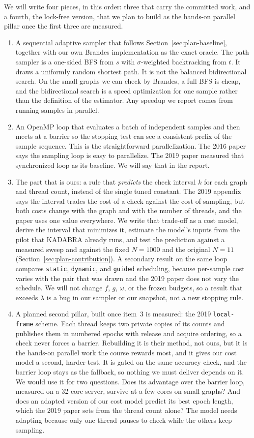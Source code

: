 \documentclass[11pt]{article}
\begin{document}
We will write four pieces, in this order: three that carry the committed work, and a fourth, the lock-free version, that we plan to build as the hands-on parallel pillar once the first three are measured.

\begin{enumerate}
\item A sequential adaptive sampler that follows Section~\ref{sec:plan-baseline}, together with our own Brandes implementation as the exact oracle. The path sampler is a one-sided BFS from $s$ with $\sigma$-weighted backtracking from $t$. It draws a uniformly random shortest path. It is not the balanced bidirectional search. On the small graphs we can check by Brandes, a full BFS is cheap, and the bidirectional search is a speed optimization for one sample rather than the definition of the estimator. Any speedup we report comes from running samples in parallel.
\item An OpenMP loop that evaluates a batch of independent samples and then meets at a barrier so the stopping test can see a consistent prefix of the sample sequence. This is the straightforward parallelization. The 2016 paper says the sampling loop is easy to parallelize. The 2019 paper measured that synchronized loop as its baseline. We will say that in the report.
\item The part that is ours: a rule that \emph{predicts} the check interval $k$ for each graph and thread count, instead of the single tuned constant. The 2019 appendix says the interval trades the cost of a check against the cost of sampling, but both costs change with the graph and with the number of threads, and the paper uses one value everywhere. We write that trade-off as a cost model, derive the interval that minimizes it, estimate the model's inputs from the pilot that KADABRA already runs, and test the prediction against a measured sweep and against the fixed $N=1000$ and the original $N=11$ (Section~\ref{sec:plan-contribution}). A secondary result on the same loop compares \texttt{static}, \texttt{dynamic}, and \texttt{guided} scheduling, because per-sample cost varies with the pair that was drawn and the 2019 paper does not vary the schedule. We will not change $f$, $g$, $\omega$, or the frozen budgets, so a result that exceeds $\lambda$ is a bug in our sampler or our snapshot, not a new stopping rule.
\item A planned second pillar, built once item~3 is measured: the 2019 \texttt{local-frame} scheme. Each thread keeps two private copies of its counts and publishes them in numbered epochs with release and acquire ordering, so a check never forces a barrier. Rebuilding it is their method, not ours, but it is the hands-on parallel work the course rewards most, and it gives our cost model a second, harder test. It is gated on the same accuracy check, and the barrier loop stays as the fallback, so nothing we must deliver depends on it. We would use it for two questions. Does its advantage over the barrier loop, measured on a 32-core server, survive at a few cores on small graphs? And does an adapted version of our cost model predict its best epoch length, which the 2019 paper sets from the thread count alone? The model needs adapting because only one thread pauses to check while the others keep sampling.

\end{enumerate}
\end{document}
